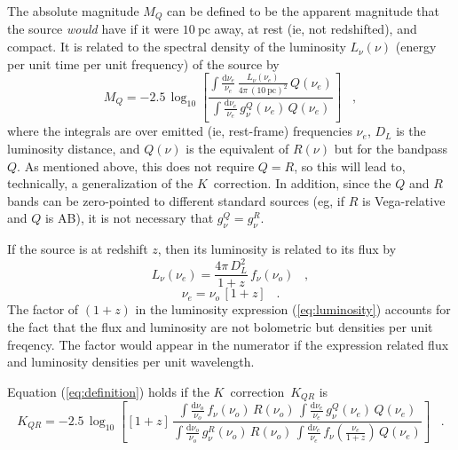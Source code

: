 \documentclass[preprint]{aastex}
\newcommand{\kcorrection}{$K$~correction}
\newcommand{\nuobs}{\nu_o}
\newcommand{\nuemit}{\nu_e}
\begin{document}
The absolute magnitude $M_Q$ can be defined to be the apparent
magnitude that the source \emph{would} have if it were
$10~\mathrm{pc}$ away, at rest (ie, not redshifted), and compact.  It
is related to the spectral density of the luminosity $L_{\nu}(\nu)$
(energy per unit time per unit frequency) of the source by
\begin{equation}
M_Q = -2.5\,\log_{10}\left[
  \frac{\displaystyle
          \int\frac{\mathrm{d}\nuemit}{\nuemit}\,
              \frac{L_{\nu}(\nuemit)}{4\pi\,(10~\mathrm{pc})^2}\,Q(\nuemit)}
       {\displaystyle
          \int\frac{\mathrm{d}\nuemit}{\nuemit}\,g^Q_{\nu}(\nuemit)\,Q(\nuemit)}
\right] \;\;\;,
\end{equation}
where the integrals are over emitted (ie, rest-frame) frequencies
$\nuemit$, $D_L$ is the luminosity distance, and $Q(\nu)$ is the
equivalent of $R(\nu)$ but for the bandpass $Q$.  As mentioned above,
this does not require $Q=R$, so this will lead to, technically, a
generalization of the \kcorrection.  In addition, since the $Q$ and
$R$ bands can be zero-pointed to different standard sources (eg, if
$R$ is Vega-relative and $Q$ is AB), it is not necessary that
$g^Q_{\nu}=g^R_{\nu}$.

If the source is at redshift $z$, then its luminosity is related to
its flux by
\begin{equation}
\label{eq:luminosity}
L_{\nu}(\nuemit) = \frac{4\pi\,D_L^2}{1+z}\,f_{\nu}(\nuobs) \;\;\;,
\end{equation}
\begin{equation}
\nuemit = \nuobs\,[1+z] \;\;\;.
\end{equation}
The factor of $(1+z)$ in the luminosity expression
(\ref{eq:luminosity}) accounts for the fact that the flux and
luminosity are not bolometric but densities per unit freqency.  The
factor would appear in the numerator if the expression related flux
and luminosity densities per unit wavelength.

Equation (\ref{eq:definition}) holds if the \kcorrection\ $K_{QR}$ is
\begin{equation}
\label{eq:kcorrection}
K_{QR} = -2.5\,\log_{10}\left[[1+z]\,
  \frac{\displaystyle
          \int\frac{\mathrm{d}\nuobs}{\nuobs}\,f_{\nu}(\nuobs)\,R(\nuobs)\,
          \int\frac{\mathrm{d}\nuemit}{\nuemit}\,g^Q_{\nu}(\nuemit)\,Q(\nuemit)}
       {\displaystyle
          \int\frac{\mathrm{d}\nuobs}{\nuobs}\,g^R_{\nu}(\nuobs)\,R(\nuobs)\,
          \int\frac{\mathrm{d}\nuemit}{\nuemit}\,
            f_{\nu}\!\left(\frac{\nuemit}{1+z}\right)\,Q(\nuemit)}
\right] \;\;\;.
\end{equation}
\end{document}
